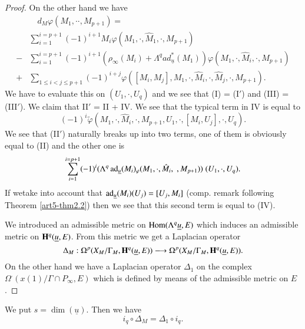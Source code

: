 \begin{proof}
On the other hand we have 
\begin{align*}
&\quad d_M \varphi (M_1, \cdot \cdot, M_{p+1} ) =\\
& \sum\limits^{i=p+1}_{i=1} (-1)^{i+1} M_i \varphi (M_1, \cdot , \hat{M}_1, \cdot , M_{p+1})  \tag{I$'$}\\
- & \sum\limits^{i=p+1}_{i=1} (-1)^{i+1} (\rho_\infty (M_i) + \Lambda^q ad^\ast_{\underline{u}} (M_1)) \varphi (M_1, \cdot , \hat{M}_i, \cdot, M_{p+1}) \tag{II$'$}\\
+ & \sum\limits_{1 \leqslant i < j \leqslant p +1} (-1)^{i+j} \varphi ([M_i, M_j], M_1, \cdot , \hat{M}_i, \cdot, \hat{M}_j, \cdot , M_{p+1}). \tag{III$'$}
\end{align*}
We have to evaluate this on $(U_1, \cdot , U_q)$ and we see that (I) = (I$'$) and (III) = (III$'$). We claim that II$'$ = II + IV. We see that the typical term in IV is equal to 
$$
(-1)^i \tilde{\varphi} (M_1, \cdot , \hat{M}_i,\cdot , M_{p+1}, U_1, \cdot , [M_i, U_j], \cdot , U_q).
$$
We see that (II$'$) naturally breaks up into two terms, one of them is obviously equal to (II) and the other one is 
$$
\sum\limits^{i=p+1}_{i=1} (-1)^i (\Lambda^q \operatorname{ad}_{\underline{u}} (M_i)_\varphi (M_1, \cdot , \hat{M}_i, \; , M_{p+1})) \; (U_1, \cdot , U_q).
$$
If we\pageoriginale take into account that $\operatorname{ad}_{\underline{u}} (M_i) (U_j) =[U_j, M_i]$ (comp. remark following Theorem \ref{art5-thm2.2}) then we see that this second term is equal to (IV).

We introduced an admissible metric on $\operatorname{Hom} (\Lambda^q \underline{u}, E)$ which induces an admissible metric on $\mathbf{H}^q (\underline{u}, E)$. From this metric we get a Laplacian operator
$$
\Delta_M : \Omega^p (X_M /\Gamma_M, \mathbf{H}^q (\underline{u}, E)) \longrightarrow \Omega^p (X_M / \Gamma_M , \mathbf{H}^q (\underline{u}, E)).
$$
On the other hand we have a Laplacian operator $\Delta_1$ on the complex $\Omega^\cdot (x(1)/ \Gamma \cap P_\infty, E)$ which is defined by means of the admissible metric on $E$.
\end{proof}

\begin{lemma}\label{art5-lem2.7}
We put $s = \dim (\underline{u})$. Then we have
$$
i_q \circ \Delta_M = \Delta_1 \circ i_q.
$$
\end{lemma}

